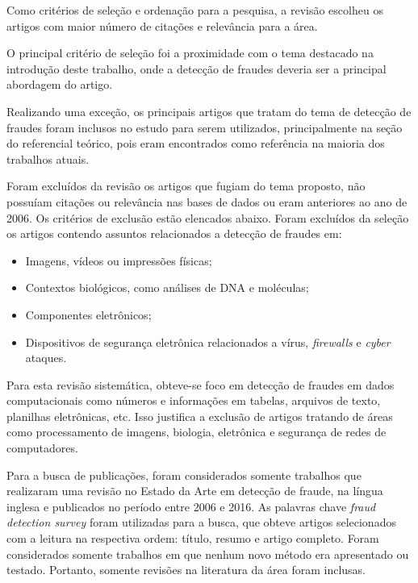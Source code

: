 \documentclass[smallextended]{svjour3}
\begin{document}
Como critérios de seleção e ordenação para a pesquisa, a revisão escolheu os artigos com maior número de citações e relevância para a área. 

O principal critério de seleção foi a proximidade com o tema destacado na introdução deste trabalho, onde a detecção de fraudes deveria ser a principal abordagem do artigo.

Realizando uma exceção, os principais artigos que tratam do tema de detecção de fraudes foram inclusos no estudo para serem utilizados, principalmente na seção do referencial teórico, pois eram encontrados como referência na maioria dos trabalhos atuais.

Foram excluídos da revisão os artigos que fugiam do tema proposto, não possuíam citações ou relevância nas bases de dados ou eram anteriores ao ano de 2006. Os critérios de exclusão estão elencados abaixo. Foram excluídos da seleção os artigos contendo assuntos relacionados a detecção de fraudes em:

\begin{itemize}
	\item Imagens, vídeos ou impressões físicas;
	
	\item Contextos biológicos, como análises de DNA e moléculas;
	
	\item Componentes eletrônicos; 	
	
	\item Dispositivos de segurança eletrônica relacionados a vírus, \emph{firewalls} e \emph{cyber} ataques.
\end{itemize}

Para esta revisão sistemática, obteve-se foco em detecção de fraudes em dados computacionais como números e informações em tabelas, arquivos de texto, planilhas eletrônicas, etc. Isso justifica a exclusão de artigos tratando de áreas como processamento de imagens, biologia, eletrônica e segurança de redes de computadores.

Para a busca de publicações, foram considerados somente trabalhos que realizaram uma revisão no Estado da Arte em detecção de fraude, na língua inglesa e publicados no período entre 2006 e 2016. As palavras chave \emph{fraud detection survey} foram utilizadas para a busca, que obteve artigos selecionados com a leitura na respectiva ordem: título, resumo e artigo completo. Foram considerados somente trabalhos em que nenhum novo método era apresentado ou testado. Portanto, somente revisões na literatura da área foram inclusas.
\end{document}
